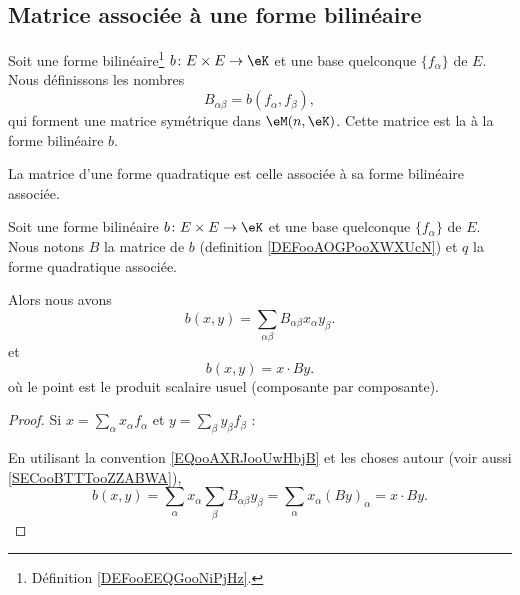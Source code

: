 \subsection{Matrice associée à une forme bilinéaire}

\begin{definition}      \label{DEFooAOGPooXWXUcN}
	Soit une forme bilinéaire\footnote{Définition \ref{DEFooEEQGooNiPjHz}.} \( b\colon E\times E\to \eK\) et une base quelconque \( \{ f_{\alpha} \}\) de \( E\). Nous définissons les nombres
	\begin{equation}    \label{EQooCUGFooRlKUtu}
		B_{\alpha\beta}=b(f_{\alpha},f_{\beta}),
	\end{equation}
	qui forment une matrice symétrique dans \( \eM(n,\eK)\). Cette matrice est la  à la forme bilinéaire \( b\).

	La matrice d'une forme quadratique est celle associée à sa forme bilinéaire associée.
\end{definition}

\begin{lemma}       \label{LEMooDCIOooTlVZMR}
	Soit une forme bilinéaire \( b\colon E\times E\to \eK\) et une base quelconque \( \{ f_{\alpha} \}\) de \( E\). Nous notons \( B\) la matrice de \( b\) (definition \ref{DEFooAOGPooXWXUcN}) et \( q\) la forme quadratique associée.

	Alors nous avons
	\begin{equation}        \label{EQooQFMWooVKVLMx}
		b(x,y)=\sum_{\alpha\beta}B_{\alpha\beta}x_{\alpha}y_{\beta}.
	\end{equation}
	et
	\begin{equation}
		b(x,y)=x\cdot By.
	\end{equation}
	où le point est le produit scalaire usuel (composante par composante).
\end{lemma}

\begin{proof}
	Si \( x=\sum_{\alpha}x_{\alpha}f_{\alpha}\) et \( y=\sum_{\beta}y_{\beta}f_{\beta}\) :

	En utilisant la convention \eqref{EQooAXRJooUwHbjB} et les choses autour (voir aussi \ref{SECooBTTTooZZABWA}),
	\begin{equation}
		b(x,y)=\sum_{\alpha}x_{\alpha}\sum_{\beta}B_{\alpha\beta}y_{\beta}=\sum_{\alpha}x_{\alpha}(By)_{\alpha}=x\cdot By.
	\end{equation}
\end{proof}

